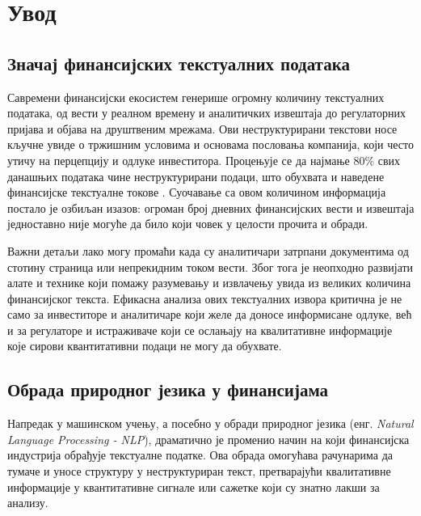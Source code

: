 \chapter{Увод}
\label{sec:1}

\section{Значај финансијских текстуалних података}

Савремени финансијски екосистем генерише огромну количину текстуалних података, од вести у реалном времену и аналитичких извештаја до регулаторних пријава и објава на друштвеним мрежама. Ови неструктурирани текстови носе кључне увиде о тржишним условима и основама пословања компанија, који често утичу на перцепцију и одлуке инвеститора. Процењује се да најмање 80\% свих данашњих података чине неструктурирани подаци, што обухвата и наведене финансијске текстуалне токове \cite{rocha_discovering_2021}. Суочавање са овом количином информација постало је озбиљан изазов: огроман број дневних финансијских вести и извештаја једноставно није могуће да било који човек у целости прочита и обради. 
\newline

Важни детаљи лако могу промаћи када су аналитичари затрпани документима од стотину страница или непрекидним током вести. Због тога је неопходно развијати алате и технике који помажу разумевању и извлачењу увида из великих количина финансијског текста. Ефикасна анализа ових текстуалних извора критична је не само за инвеститоре и аналитичаре који желе да доносе информисане одлуке, већ и за регулаторе и истраживаче који се ослањају на квалитативне информације које сирови квантитативни подаци не могу да обухвате.

\section{Обрада природног језика у финансијама}

Напредак у машинском учењу, а посебно у обради природног језика (енг. \textit{Natural Language Processing - NLP}), драматично је променио начин на који финансијска индустрија обрађује текстуалне податке. Ова обрада омогућава рачунарима да тумаче и уносе структуру у неструктуриран текст, претварајући квалитативне информације у квантитативне сигнале или сажетке који су знатно лакши за анализу. 
\newline

